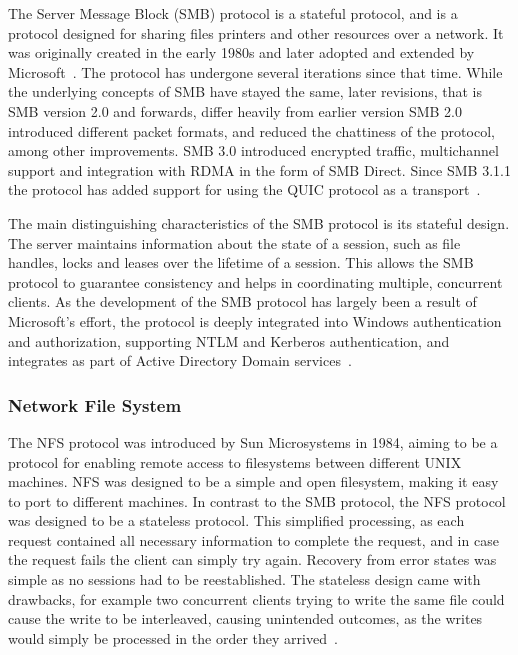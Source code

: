 \documentclass[english, 12pt, a4paper, elec, utf8, a-2b, online]{aaltothesis}
\begin{document}
The Server Message Block (SMB) protocol is a stateful protocol, and is a protocol designed for
sharing files printers and other resources over a network. It was originally created
in the early 1980s and later adopted and extended by Microsoft~\cite{samba_myths}.
The protocol has undergone several iterations since that time. While the underlying
concepts of SMB have stayed the same, later revisions, that is SMB version 2.0 and forwards,
differ heavily from earlier version SMB 2.0 introduced different packet formats, and reduced
the chattiness of the protocol, among other improvements. SMB 3.0 introduced encrypted traffic,
multichannel support and integration with RDMA in the form of SMB Direct. Since SMB 3.1.1 the
protocol has added support for using the QUIC protocol as a transport~\cite{smb2}.

The main distinguishing characteristics of the SMB protocol is its stateful design.
The server maintains information about the state of a session, such as file handles,
locks and leases over the lifetime of a session. This allows the SMB protocol to
guarantee consistency and helps in coordinating multiple, concurrent clients. As 
the development of the SMB protocol has largely been a result of Microsoft's effort,
the protocol is deeply integrated into Windows authentication and authorization,
supporting NTLM and Kerberos authentication, and integrates as part of Active Directory Domain
services~\cite{smb2}.

\subsubsection{Network File System}

The NFS protocol was introduced by Sun Microsystems in 1984, aiming to be a protocol
for enabling remote access to filesystems between different UNIX machines. NFS was
designed to be a simple and open filesystem, making it easy to port to different
machines. In contrast to the SMB protocol, the NFS protocol was designed to be a 
stateless protocol. This simplified processing, as each request contained all necessary
information to complete the request, and in case the request fails the client can
simply try again. Recovery from error states was simple as no sessions had to be
reestablished. The stateless  design came with drawbacks,
for example two concurrent clients trying to write the same file could cause the
write to be interleaved, causing unintended outcomes, as the writes would simply
be processed in the order they arrived~\cite{nfs_design}.
\end{document}
